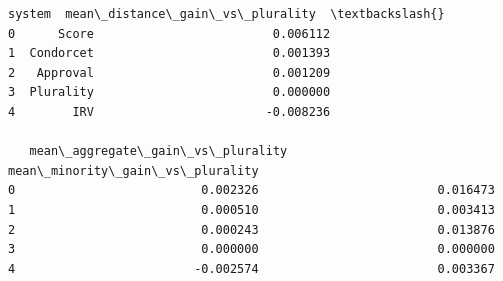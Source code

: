 \documentclass[11pt]{article}
\makeatletter
\newcommand{\boxspacing}{\kern\kvtcb@left@rule\kern\kvtcb@boxsep}
\newcommand{\prompt}[4]{
        {\ttfamily\llap{{\color{#2}[#3]:\hspace{3pt}#4}}\vspace{-\baselineskip}}
    }
\makeatother
\begin{document}
            \begin{tcolorbox}[breakable, size=fbox, boxrule=.5pt, pad at break*=1mm, opacityfill=0]
\prompt{Out}{outcolor}{35}{\boxspacing}
\begin{Verbatim}[commandchars=\\\{\}]
      system  mean\_distance\_gain\_vs\_plurality  \textbackslash{}
0      Score                         0.006112
1  Condorcet                         0.001393
2   Approval                         0.001209
3  Plurality                         0.000000
4        IRV                        -0.008236

   mean\_aggregate\_gain\_vs\_plurality  mean\_minority\_gain\_vs\_plurality
0                          0.002326                         0.016473
1                          0.000510                         0.003413
2                          0.000243                         0.013876
3                          0.000000                         0.000000
4                         -0.002574                         0.003367
\end{Verbatim}
\end{tcolorbox}
        
\end{document}

